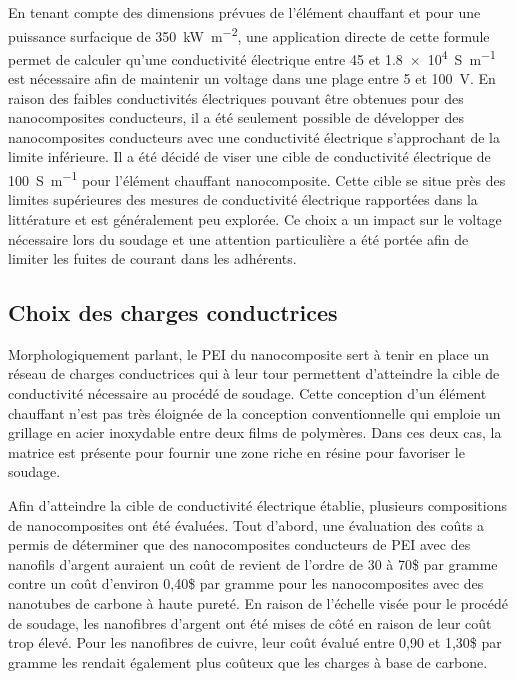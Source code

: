 En tenant compte des dimensions prévues de l'élément chauffant et pour une puissance surfacique de \SI[locale=FR]{350}{\kilo\watt\per\square\metre}, une application directe de cette formule permet de calculer qu'une conductivité électrique entre 45 et \SI[locale=FR]{1,8e4}{\siemens\per\metre} est nécessaire afin de maintenir un voltage dans une plage entre 5 et \SI[locale=FR]{100}{\volt}. 
En raison des faibles conductivités électriques pouvant être obtenues pour des nanocomposites conducteurs, il a été seulement possible de développer des nanocomposites conducteurs avec une conductivité électrique s'approchant de la limite inférieure. 
Il a été décidé de viser une cible de conductivité électrique de \SI[locale=FR]{100}{\siemens\per\metre} pour l'élément chauffant nanocomposite. 
Cette cible se situe près des limites supérieures des mesures de conductivité électrique rapportées dans la littérature et est généralement peu explorée. 
Ce choix a un impact sur le voltage nécessaire lors du soudage et une attention particulière a été portée afin de limiter les fuites de courant dans les adhérents. 

\subsection{Choix des charges conductrices}

Morphologiquement parlant, le PEI du nanocomposite sert à tenir en place un réseau de charges conductrices qui à leur tour permettent d'atteindre la cible de conductivité nécessaire au procédé de soudage. 
Cette conception d'un élément chauffant n'est pas très éloignée de la conception conventionnelle qui emploie un grillage en acier inoxydable entre deux films de polymères. 
Dans ces deux cas, la matrice est présente pour fournir une zone riche en résine pour favoriser le soudage. 

Afin d'atteindre la cible de conductivité électrique établie, plusieurs compositions de nanocomposites ont été évaluées. 
Tout d'abord, une évaluation des coûts a permis de déterminer que des nanocomposites conducteurs de PEI avec des nanofils d'argent auraient un coût de revient de l'ordre de 30 à 70\$ par gramme contre un coût d'environ 0,40\$ par gramme pour les nanocomposites avec des nanotubes de carbone à haute pureté. 
En raison de l'échelle visée pour le procédé de soudage, les nanofibres d'argent ont été mises de côté en raison de leur coût trop élevé. 
Pour les nanofibres de cuivre, leur coût évalué entre 0,90 et 1,30\$ par gramme les rendait également plus coûteux que les charges à base de carbone. 


